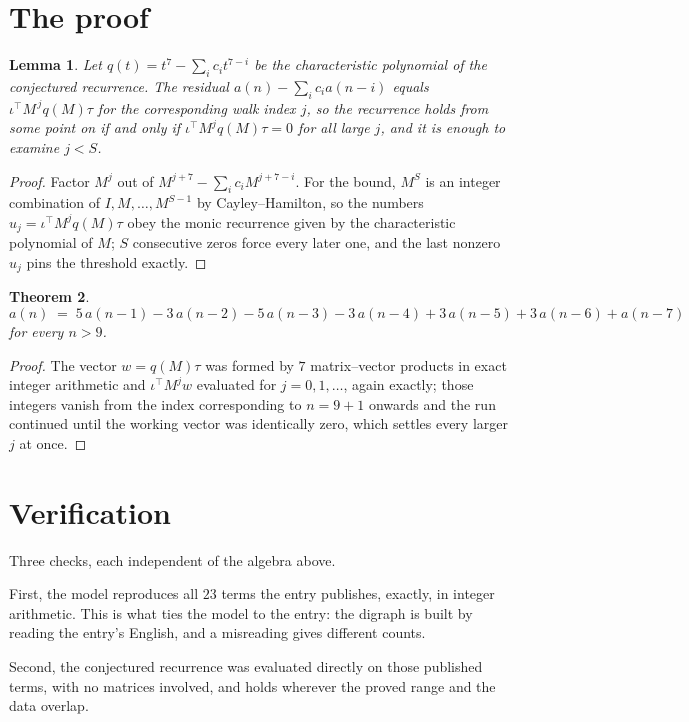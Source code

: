 \documentclass[11pt,a4paper]{article}
\theoremstyle{plain}
\newtheorem{theorem}{Theorem}
\newtheorem{lemma}[theorem]{Lemma}
\theoremstyle{definition}
\begin{document}
\section{The proof}

\begin{lemma}\label{lem:crit}
Let $q(t)=t^{7}-\sum_i c_it^{7-i}$ be the characteristic polynomial of the
conjectured recurrence. The residual $a(n)-\sum_ic_ia(n-i)$ equals
$\iota^{\!\top}M^{\,j}q(M)\tau$ for the corresponding walk index $j$, so the recurrence
holds from some point on if and only if $\iota^{\!\top}M^{j}q(M)\tau=0$ for all large $j$,
and it is enough to examine $j<S$.
\end{lemma}

\begin{proof}
Factor $M^{j}$ out of $M^{j+7}-\sum_ic_iM^{j+7-i}$. For the bound, $M^{S}$
is an integer combination of $I,M,\dots,M^{S-1}$ by Cayley--Hamilton, so the numbers
$u_j=\iota^{\!\top}M^{j}q(M)\tau$ obey the monic recurrence given by the characteristic
polynomial of $M$; $S$ consecutive zeros force every later one, and the last nonzero $u_j$
pins the threshold exactly.
\end{proof}

\begin{theorem}
\[
a(n)\;=\;5\,a(n-1) - 3\,a(n-2) - 5\,a(n-3) - 3\,a(n-4) + 3\,a(n-5) + 3\,a(n-6) + a(n-7)
\]
for every $n>9$.
\end{theorem}

\begin{proof}
The vector $w=q(M)\tau$ was formed by $7$ matrix--vector products in exact integer
arithmetic and $\iota^{\!\top}M^{j}w$ evaluated for $j=0,1,\dots$, again exactly; those
integers vanish from the index corresponding to $n=9+1$ onwards and the run continued
until the working vector was identically zero, which settles every larger $j$ at once.
\end{proof}

\section{Verification}

Three checks, each independent of the algebra above.

First, the model reproduces all $23$ terms the entry publishes, exactly, in integer
arithmetic. This is what ties the model to the entry: the digraph is built by reading the
entry's English, and a misreading gives different counts.

Second, the conjectured recurrence was evaluated directly on those published terms, with no
matrices involved, and holds wherever the proved range and the data overlap.
\end{document}
